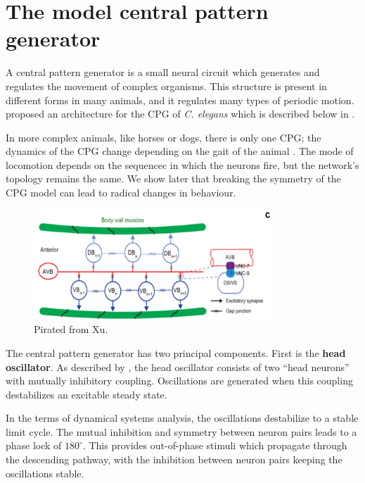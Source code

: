 \documentclass[
    11pt,
]{article}
\begin{document}
\section{The model central pattern generator}


A central pattern generator is a small neural circuit which generates and regulates the movement of complex organisms.  This structure is present in different forms in many animals, and it regulates many types of periodic motion.  \citet{xu2018} proposed an architecture for the CPG of \emph{C. elegans} which is described below in .

In more complex animals, like horses or dogs, there is only one CPG; the dynamics of the CPG change depending on the gait of the animal \citep{collins1994}.  The mode of locomotion depends on the sequencec in which the neurons fire, but the network's topology remains the same.  We show later that breaking the symmetry of the CPG model can lead to radical changes in behaviour.

\begin{figure}[h!]
    \label{fig: xu_cpg}
    \centering
    \includegraphics[width=9cm]{figures/xu_cpg/xu_cpg.png}
    \caption{Pirated from Xu.}
\end{figure}

The central pattern generator has two principal components.  First is the \textbf{head oscillator}. As described by \citet{gjorgjieva2014}, the head oscillator consists of two “head neurons” with mutually inhibitory coupling.  Oscillations are generated when this coupling destabilizes an excitable steady state.

In the terms of dynamical systems analysis, the oscillations destabilize to a stable limit cycle.  The mutual inhibition and symmetry between neuron pairs leads to a phase lock of $180^\circ$.  This provides out-of-phase stimuli which propagate through the descending pathway, with the inhibition between neuron pairs keeping the oscillations stable.
\end{document}
